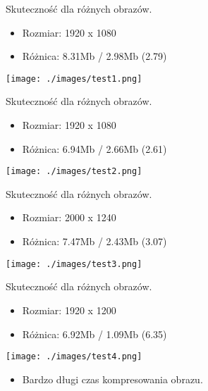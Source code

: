 \documentclass[presentation]{beamer}
\begin{document}
\begin{frame}[label={sec:orgc9440fc}]{Skuteczność dla różnych obrazów.}
\begin{itemize}
\item Rozmiar: 1920 x 1080
\item Różnica: 8.31Mb / 2.98Mb (2.79)
\end{itemize}
\begin{center}
\texttt{[image: ./images/test1.png]}
\end{center}
\end{frame}

\begin{frame}[label={sec:org8e8ac11}]{Skuteczność dla różnych obrazów.}
\begin{itemize}
\item Rozmiar: 1920 x 1080
\item Różnica: 6.94Mb / 2.66Mb (2.61)
\end{itemize}
\begin{center}
\texttt{[image: ./images/test2.png]}
\end{center}
\end{frame}

\begin{frame}[label={sec:org1182e53}]{Skuteczność dla różnych obrazów.}
\begin{itemize}
\item Rozmiar: 2000 x 1240
\item Różnica: 7.47Mb / 2.43Mb (3.07)
\end{itemize}
\begin{center}
\texttt{[image: ./images/test3.png]}
\end{center}
\end{frame}

\begin{frame}[label={sec:orgdbb6baf}]{Skuteczność dla różnych obrazów.}
\begin{itemize}
\item Rozmiar: 1920 x 1200
\item Różnica: 6.92Mb / 1.09Mb (6.35)
\end{itemize}
\begin{center}
\texttt{[image: ./images/test4.png]}
\end{center}
\begin{itemize}
\item Bardzo długi czas kompresowania obrazu.
\end{itemize}
\end{frame}
\end{document}
